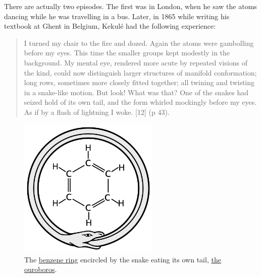 \documentclass[
  11pt,
  a4paper,
]{article}
\begin{document}
There are actually two episodes. The first was in London, when he saw
the atoms dancing while he was travelling in a bus. Later, in 1865 while
writing his textbook at Ghent in Belgium, Kekulé had the following
experience:

\begin{quote}
I turned my chair to the fire and dozed. Again the atoms were gambolling
before my eyes. This time the smaller groups kept modestly in the
background. My mental eye, rendered more acute by repeated visions of
the kind, could now distinguish larger structures of manifold
conformation; long rows, sometimes more closely fitted together; all
twining and twisting in a snake-like motion. But look! What was that?
One of the snakes had seized hold of its own tail, and the form whirled
mockingly before my eyes. As if by a flash of lightning I woke. {[}12{]}
(p 43).
\end{quote}

\begin{figure}
\hypertarget{fig:benzene}{%
\centering
\includegraphics[width=0.6\textwidth,height=\textheight]{images/ouroboros-benzene.svg}
\caption[The
\href{https://en.wikipedia.org/wiki/Benzene\#Structure}{benzene ring}
encircled by the snake eating its own tail,
\href{https://en.wikipedia.org/wiki/Ouroboros}{the ouroboros}.]{The
\href{https://en.wikipedia.org/wiki/Benzene\#Structure}{benzene ring}
encircled by the snake eating its own tail,
\href{https://en.wikipedia.org/wiki/Ouroboros}{the
ouroboros}.\footnotemark{}}\label{fig:benzene}
}
\end{figure}
\end{document}

